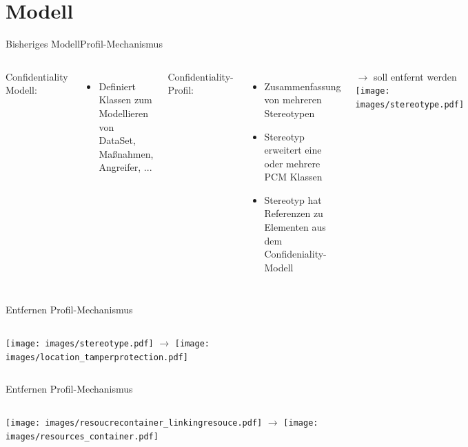 \documentclass{sdqbeamer}
\begin{document}
\section{Modell}
\begin{frame}{Bisheriges Modell}{Profil-Mechanismus}
\begin{columns}
Confidentiality Modell: 
\begin{itemize}
	\item Definiert Klassen zum Modellieren von DataSet, Maßnahmen, Angreifer, ...
\end{itemize}
Confidentiality-Profil:
\begin{itemize}
	\item Zusammenfassung von mehreren Stereotypen
	\item Stereotyp erweitert eine oder mehrere PCM Klassen
	\item Stereotyp hat Referenzen zu Elementen aus dem Confideniality-Modell
\end{itemize}%
$\rightarrow$ soll entfernt werden
\centering
\texttt{[image: images/stereotype.pdf]}
\end{columns}
\end{frame}	

\begin{frame}{Entfernen Profil-Mechanismus}
	\begin{columns}
		\centering
	\texttt{[image: images/stereotype.pdf]}
	\centering
	$\rightarrow$
	\centering
	\texttt{[image: images/location\_tamperprotection.pdf]}
	\end{columns}
\end{frame}
\begin{frame}{Entfernen Profil-Mechanismus}
	\begin{columns}
		\centering
		\texttt{[image: images/resoucrecontainer\_linkingresouce.pdf]}
		\centering
		$\rightarrow$
		\centering
		\texttt{[image: images/resources\_container.pdf]}
	\end{columns}
\end{frame}
\end{document}
